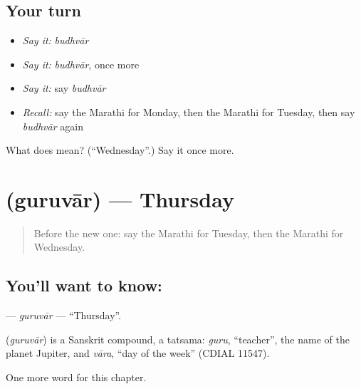 \subsection*{Your turn}
\begin{itemize}
\raggedright
  \item \emph{Say it:} \emph{budhvār}
  \item \emph{Say it:} \emph{budhvār}, once more
  \item \emph{Say it:} say \emph{budhvār}
  \item \emph{Recall:} say the Marathi for Monday, then the Marathi for Tuesday, then say \emph{budhvār} again
\end{itemize}

\begin{tcolorbox}[breakable,colback=teal!4,colframe=teal!35!black,title={Before you move on}]
What does  mean? (\textquotedblleft{}Wednesday\textquotedblright{}.) Say it once more.
\end{tcolorbox}
\section[\texorpdfstring{\mr{गुरुवार} (guruvār)}{गुरुवार (guruvār)}]{ (guruvār) — Thursday}

\label{lesson:MR-C125-guruvar}



\begin{quote}
Before the new one: say the Marathi for Tuesday, then the Marathi for Wednesday.
\end{quote}

\subsection*{You'll want to know: }
\textbf{} — \emph{guruvār} — \textquotedblleft{}Thursday\textquotedblright{}.

\begin{cousinweb}
\textbf{} (\emph{guruvār}) is a Sanskrit compound, a tatsama: \emph{guru}, \textquotedblleft{}teacher\textquotedblright{}, the name of the planet Jupiter, and \emph{vāra}, \textquotedblleft{}day of the week\textquotedblright{} (CDIAL 11547).
\end{cousinweb}

\begin{grammarlens}[title={What you've built}]
One more word for this chapter.
\end{grammarlens}


